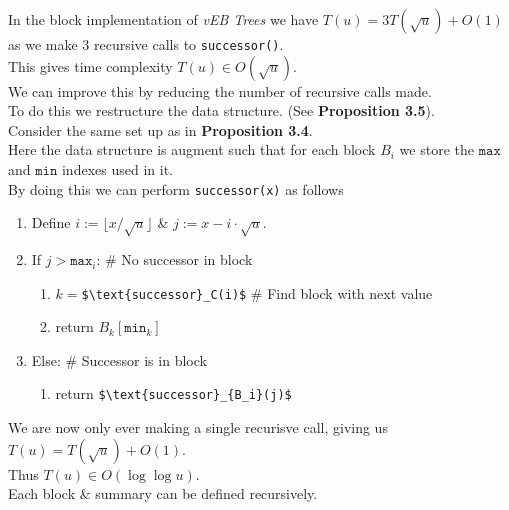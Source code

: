 \documentclass[11pt,a4paper]{article}
\begin{document}
In the block implementation of \textit{vEB Trees} we have $T(u)=3T(\sqrt{u})+O(1)$ as we make 3 recursive calls to \lstinline!successor()!.\\
This gives time complexity $T(u)\in O(\sqrt{u})$.\\
We can improve this by reducing the number of recursive calls made.\\
To do this we restructure the data structure. (See \textbf{Proposition 3.5}).\\

Consider the same set up as in \textbf{Proposition 3.4}.\\
Here the data structure is augment such that for each block $B_i$ we store the $\mathtt{max}$ and $\mathtt{min}$ indexes used in it.\\
By doing this we can perform \lstinline!successor(x)! as follows
\begin{enumerate}
	\item Define $i:=\lfloor x/\sqrt{u}\rfloor$ \& $j:=x-i\cdot\sqrt{u}$.
	\item If $j>\mathtt{max}_i$: \# No successor in block
	\begin{enumerate}
		\item $k=$\lstinline!$\text{successor}_C(i)$! \# Find block with next value
		\item return $B_k[\mathtt{min}_k]$
	\end{enumerate}
	\item Else: \# Successor is in block
	\begin{enumerate}
		\item return \lstinline!$\text{successor}_{B_i}(j)$!
	\end{enumerate}
\end{enumerate}
We are now only ever making a single recurisve call, giving us $T(u)=T(\sqrt{u})+O(1)$.\\
Thus $T(u)\in O(\log\log u)$.\\
\nb Each block \& summary can be defined recursively.\\
\end{document}
